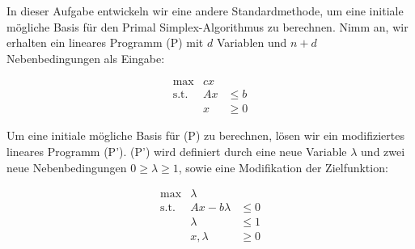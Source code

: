 \documentclass{uebung_cs}
\begin{document}
\begin{aufgabe}
%
%
%
%
	In dieser Aufgabe entwickeln wir eine andere Standardmethode, um eine initiale mögliche Basis für den Primal Simplex-Algorithmus zu berechnen. Nimm an, wir erhalten ein lineares Programm (P) mit $d$ Variablen und $n + d$ Nebenbedingungen als Eingabe:
	
	\[
		\begin{array}{rrl}
			\text{max}   &  cx &  	    \\
			\text{s.t.}  &	Ax & \leq b \\
						 &	x  & \geq 0
		\end{array}
	\]
	
	Um eine initiale mögliche Basis für (P) zu berechnen, lösen wir ein modifiziertes lineares Programm (P'). (P') wird definiert durch eine neue Variable $\lambda$ und zwei neue Nebenbedingungen $0 \geq \lambda \geq 1$, sowie eine Modifikation der Zielfunktion:
	
	\[
		\begin{array}{rrl}
			\text{max}   &        \lambda & 	   \\
			\text{s.t.}  &	Ax - b\lambda & \leq 0 \\
						 &		  \lambda & \leq 1 \\
						 &	 x, \lambda   & \geq 0
		\end{array}
	\]
	

\end{aufgabe}
\end{document}
